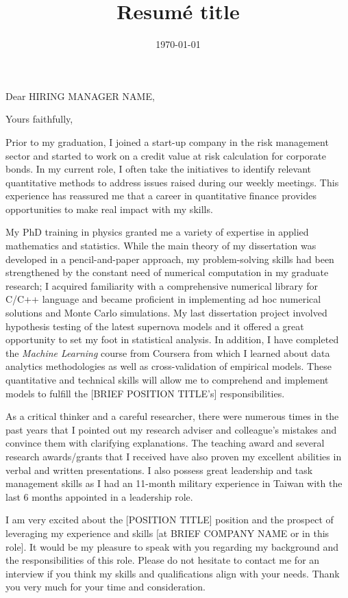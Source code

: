 \documentclass[11pt,a4paper,roman]{moderncv}
\title{Resumé title}
\begin{document}
\date{\today}

\opening{Dear HIRING MANAGER NAME,}
\closing{Yours faithfully,}
\makelettertitle
\justify
Prior to my graduation, I joined a start-up company in the risk management sector and started to work on a credit value at risk calculation for corporate bonds. In my current role, I often take the initiatives to identify relevant quantitative methods to address issues raised during our weekly meetings. This experience has reassured me that a career in quantitative finance provides opportunities to make real impact with my skills.

My PhD training in physics granted me a variety of expertise in applied mathematics and statistics. While the main theory of my dissertation was developed in a pencil-and-paper approach, my problem-solving skills had been strengthened by the constant need of numerical computation in my graduate research; I acquired familiarity with a comprehensive numerical library for C/C++ language and became proficient in implementing ad hoc numerical solutions and Monte Carlo simulations. My last dissertation project involved hypothesis testing of the latest supernova models and it offered a great opportunity to set my foot in statistical analysis. In addition, I have completed the \textit{Machine Learning} course from Coursera from which I learned about data analytics methodologies as well as cross-validation of empirical models. These quantitative and technical skills will allow me to comprehend and implement models to fulfill the
[BRIEF POSITION TITLE's]
responsibilities.  

As a critical thinker and a careful researcher, there were numerous times in the past years that I pointed out my research adviser and colleague's mistakes and convince them with clarifying explanations. The teaching award and several research awards/grants that I received have also proven my excellent abilities in verbal and written presentations. I also possess great leadership and task management skills as I had an 11-month military experience in Taiwan with the last 6 months appointed in a leadership role. 

I am very excited about the
[POSITION TITLE]
position and the prospect of leveraging my experience and skills
[at BRIEF COMPANY NAME or in this role].
It would be my pleasure to speak with you regarding my background and the responsibilities of this role. Please do not hesitate to contact me for an interview if you think my skills and qualifications align with your needs. Thank you very much for your time and consideration.

\makeletterclosing
\end{document}

